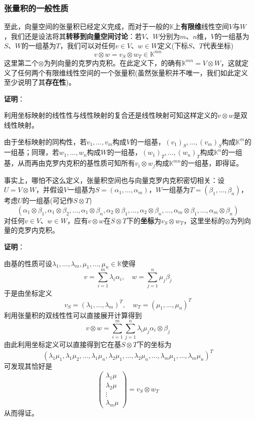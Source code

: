 \documentclass[a4paper,UTF8,fontset=windows,AutoFakeBold]{ctexart}
\newcommand{\proo}[1]{{\vspace{5pt}\kaishu\noindent\textbf{证明}：\vspace{-3pt}
\begin{compactitem}
    \item[] #1
\end{compactitem}
}}
\begin{document}
\subsubsection{张量积的一般性质}
至此，向量空间的张量积已经定义完成，而对于一般的$\mathbb{K}$上\textbf{有限维}线性空间$V$与$W$，我们还是设法将其\textbf{转移到向量空间讨论}：若$V$、$W$分别为$m$、$n$维，$V$的一组基为$S$、$W$的一组基为$T$，我们可以对任何$v\in V$、$w\in W$定义(下标$S$、$T$代表坐标)
$$v\otimes w=v_S\otimes w_T\in\mathbb{K}^{mn}$$
这里第二个$\otimes$为列向量的克罗内克积。在此定义下，的确有$\mathbb{K}^{mn}=V\otimes W$，这就定义了任何两个有限维线性空间的一个张量积(虽然张量积并不唯一，我们如此定义至少说明了其\textbf{存在性})。

\proo{
    利用坐标映射的线性性与线性映射的复合还是线性映射可知这样定义的$v\otimes w$是双线性映射。

    由于坐标映射的同构性，若$v_1,\dots,v_m$构成$V$的一组基，$(v_1)_S,\dots,(v_m)_S$构成$\mathbb{K}^m$的一组基；同理，若$w_1,\dots,w_n$构成$W$的一组基，$(w_1)_T,\dots,(w_n)_T$构成$\mathbb{K}^n$的一组基，从而再由克罗内克积的基性质可知所有$v_i\otimes w_j$构成$\mathbb{K}^{mn}$的一组基，即得证。
}

事实上，哪怕不这么定义，张量积空间也与向量克罗内克积密切相关：设$U=V\otimes W$，并假设$V$一组基为$S=(\alpha_1,\dots,\alpha_m)$，$W$一组基为$T=(\beta_1,\dots,\beta_n)$，考虑$U$的一组基(可记作$S\otimes T$)
$$(\alpha_1\otimes\beta_1,\alpha_1\otimes\beta_2,\dots,\alpha_1\otimes\beta_n,\alpha_2\otimes\beta_1,\dots,\alpha_2\otimes\beta_n,\dots,\alpha_m\otimes\beta_1,\dots,\alpha_m\otimes\beta_n)$$
对任何$v\in V$、$w\in W$，应有$v\otimes w$在$S\otimes T$下的\textbf{坐标}为$v_S\otimes w_T$，这里坐标的$\otimes$为列向量的克罗内克积。

\proo{
    由基的性质可设$\lambda_1,\dots,\lambda_m,\mu_1,\dots,\mu_n\in\mathbb{K}$使得
    $$v=\sum_{i=1}^m\lambda_i\alpha_i,\quad w=\sum_{j=1}^n\mu_j\beta_j$$
    于是由坐标定义
    $$v_S=(\lambda_1,\dots,\lambda_m)^T,\quad w_T=(\mu_1,\dots,\mu_n)^T$$
    利用张量积的双线性性可以直接展开计算得到
    $$v\otimes w=\sum_{i=1}^m\sum_{j=1}^n\lambda_i\mu_j\alpha_i\otimes\beta_j$$
    由此利用坐标定义可以直接得到它在基$S\otimes T$下的坐标为
    $$(\lambda_1\mu_1,\lambda_1\mu_2,\dots,\lambda_1\mu_n,\lambda_2\mu_1,\dots,\lambda_2\mu_n,\dots,\lambda_m\mu_1,\dots,\lambda_m\mu_n)^T$$
    可发现其恰好是
    $$\begin{pmatrix}\lambda_1\mu\\\lambda_2\mu\\\vdots\\\lambda_m\mu\end{pmatrix}=v_S\otimes w_T$$
    从而得证。
}
\end{document}
